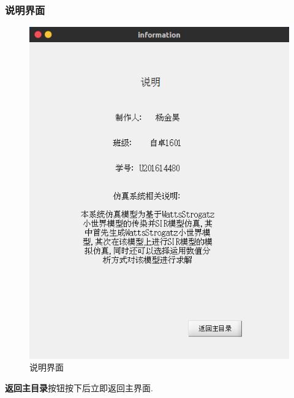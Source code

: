 \documentclass[supercite]{HustGraduPaper}
\begin{document}
	\subsubsection{说明界面}
	\begin{figure}[H]
		\centering
		\includegraphics[scale=0.4]{Figures/info.png}
		\caption{说明界面}
	\end{figure} 
	\textbf{返回主目录}按钮按下后立即返回主界面.
\end{document}
